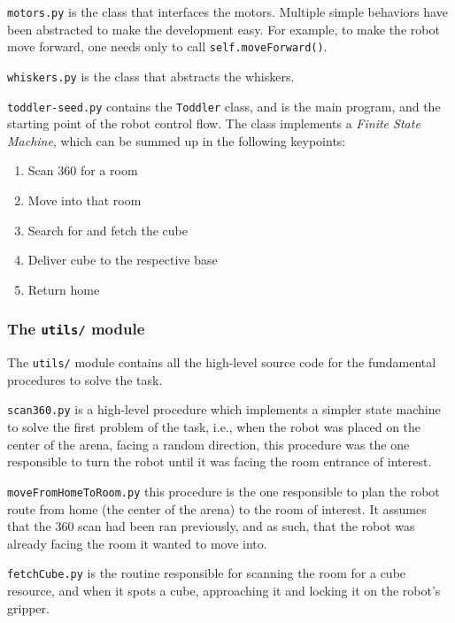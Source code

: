 \texttt{motors.py} is the class that interfaces the motors. Multiple simple behaviors have been abstracted to make the development easy. For example, to make the robot move forward, one needs only to call \texttt{self.moveForward()}.

\texttt{whiskers.py} is the class that abstracts the whiskers.

\texttt{toddler-seed.py} contains the \texttt{Toddler} class, and is the main program, and the starting point of the robot control flow. The class implements a \textit{Finite State Machine}, which can be summed up in the following keypoints:

\medskip

\begin{enumerate}
    \centering
    \item Scan 360 for a room
    \item Move into that room
    \item Search for and fetch the cube
    \item Deliver cube to the respective base
    \item Return home
\end{enumerate}


\subsubsection{The \texttt{utils/} module}

The \texttt{utils/} module contains all the high-level source code for the fundamental procedures to solve the task.

\texttt{scan360.py} is a high-level procedure which implements a simpler state machine to solve the first problem of the task, i.e., when the robot was placed on the center of the arena, facing a random direction, this procedure was the one responsible to turn the robot until it was facing the room entrance of interest.

\texttt{moveFromHomeToRoom.py} this procedure is the one responsible to plan the robot route from home (the center of the arena) to the room of interest. It assumes that the 360 scan had been ran previously, and as such, that the robot was already facing the room it wanted to move into.

\texttt{fetchCube.py} is the routine responsible for scanning the room for a cube resource, and when it spots a cube, approaching it and locking it on the robot's gripper.

